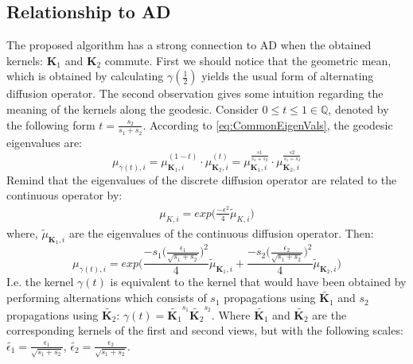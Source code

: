 \documentclass[]{article}
\theoremstyle{definition}
\begin{document}
	\subsection{Relationship to AD}
	The proposed algorithm has a strong connection to AD when the obtained kernels: $\mathbf{K}_1$ and $\mathbf{K}_2$ commute.
	First we should notice that the geometric mean, which is obtained by calculating $\gamma(\frac{1}{2})$ yields the usual form of alternating diffusion operator. 
	The second observation gives some intuition regarding the meaning of the kernels along the geodesic. Consider $0\leq t \leq 1 \in \mathbb{Q}$, denoted by the following form $t=\frac{s_2}{s_1+s_2}$. According to \ref{eq:CommonEigenVals}, the geodesic eigenvalues are:
	\begin{equation}
	\mu_{\gamma(t),i} = \mu_{\mathbf{K}_1,i}^{(1-t)} \cdot \mu_{\mathbf{K}_2,i}^{(t)} = \mu_{\mathbf{K}_1,i}^{\frac{s1}{s_1+s_2}} \cdot \mu_{\mathbf{K}_2,i}^{\frac{s2}{s_1+s_2}}
	\end{equation}
	Remind that the eigenvalues of the discrete diffusion operator are related to the continuous operator by:
	\begin{eqnarray*}
		\mu_{K,i}=  exp\bigg( \frac{-\epsilon ^2}{4}\widetilde{\mu}_{K,i}\bigg)
	\end{eqnarray*}
	where, ${\tilde{\mu}}_{\mathbf{K}_1,i}$ are the eigenvalues of the continuous diffusion operator. Then:
	\begin{equation}
	\mu_{\gamma(t),i} = exp\bigg( \frac{-s_1\bigg(\frac{\epsilon_1}{\sqrt{s_1+s_2}}\bigg)^2}{4}\widetilde{\mu}_{\mathbf{K}_1,i} + \frac{-s_2\bigg(\frac{\epsilon_2}{\sqrt{s_1+s_2}}\bigg)^2}{4}\widetilde{\mu}_{\mathbf{K}_2,i}\bigg)
	\end{equation}
	I.e. the kernel $\gamma(t)$ is equivalent to the kernel that would have been obtained by performing alternations which consists of $s_1$ propagations using $\tilde{\mathbf{K}_1}$ and $s_2$ propagations using $\tilde{\mathbf{K}_2}$: $\gamma(t)=\tilde{\mathbf{K}_1}^{s_1} \tilde{\mathbf{K}_2}^{s_2} $. Where $\tilde{\mathbf{K}_1}$ and $\tilde{\mathbf{K}_2}$ are the corresponding kernels of the first and second views, but with the following scales: $\tilde{\epsilon_1}=\frac{\epsilon_1}{\sqrt{s_1+s_2}}$, $\tilde{\epsilon_2}=\frac{\epsilon_2}{\sqrt{s_1+s_2}}$.
	
\end{document}
